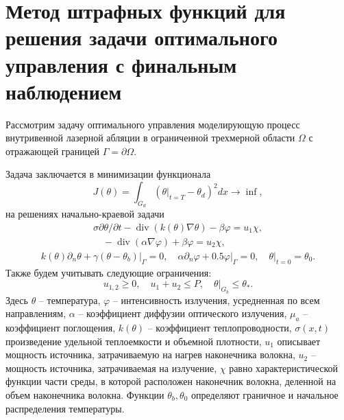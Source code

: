 \section{Метод штрафных функций для решения задачи
оптимального управления с финальным наблюдением}
\label{sec:ch3:sec3}

%
%
Рассмотрим задачу оптимального управления моделирующую процесс
внутривенной лазерной абляции в ограниченной трехмерной области
$\Omega$ с отражающей границей $\Gamma=\partial\Omega$.

Задача заключается в минимизации функционала
\[
    J(\theta)=\int_{G_{d}}\left(\left.\theta\right|_{t=T}
    -\theta_{d}\right)^{2} d x \rightarrow \inf,
\]
на решениях начально-краевой задачи
\begin{gather}
    \label{eq:3_3:1}
    \sigma \partial \theta / \partial t-\operatorname{div}(k(\theta) \nabla \theta)
    -\beta \varphi=u_{1} \chi, \\
    \quad-\operatorname{div}(\alpha \nabla \varphi)+\beta \varphi= u_{2} \chi,
\end{gather}
\begin{gather}
    \label{eq:3_3:2}
    k(\theta) \partial_{n} \theta+\left.\gamma
    \left(\theta-\theta_{b}\right)\right|_{\Gamma}=0,
    \quad \alpha \partial_{n} \varphi +
    \left.0.5 \varphi\right|_{\Gamma}=0,\left.\quad \theta\right|_{t=0}=\theta_{0}.
\end{gather}
Также будем учитывать следующие ограничения:
\[
    u_{1,2} \geq 0, \quad u_{1}+u_{2} \leq P,\left.\quad \theta\right|_{G_{b}} \leq \theta_{*}.
\]
Здесь $\theta$ --  температура, $\varphi$ --  интенсивность излучения, усредненная по всем направлениям,
$\alpha$ --  коэффициент диффузии оптического излучения, $\mu_{a}$ --  коэффициент поглощения,
$k(\theta)$ --  коэффициент теплопроводности, $\sigma(x, t)$ произведение удельной теплоемкости
и объемной плотности, $u_{1}$ описывает мощность источника, затрачиваемую
на нагрев наконечника волокна, $u_{2}$ --  мощность источника, затрачиваемая на излучение,
$\chi$ равно характеристической функции части среды, в которой расположен наконечник волокна,
деленной на объем наконечника волокна.
Функции $\theta_{b}, \theta_{0}$ определяют граничное и начальное распределения температуры.

